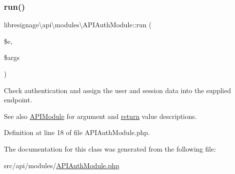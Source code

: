 \subsubsection{\texorpdfstring{run()}{run()}}
{\footnotesize\ttfamily libresignage\textbackslash{}api\textbackslash{}modules\textbackslash{}\+A\+P\+I\+Auth\+Module\+::run (\begin{DoxyParamCaption}\item[{\hyperlink{classlibresignage_1_1api_1_1APIEndpoint}{A\+P\+I\+Endpoint}}]{\$e,  }\item[{array}]{\$args }\end{DoxyParamCaption})}

Check authentication and assign the user and session data into the supplied endpoint.

\begin{DoxySeeAlso}{See also}
\hyperlink{classlibresignage_1_1api_1_1APIModule}{A\+P\+I\+Module} for argument and \hyperlink{quota_200-default_8php_ae057f510746f2e7dcbd7d8ccfaf92a45}{return} value descriptions. 
\end{DoxySeeAlso}


Definition at line 18 of file A\+P\+I\+Auth\+Module.\+php.



The documentation for this class was generated from the following file\+:\begin{DoxyCompactItemize}
\item 
src/api/modules/\hyperlink{APIAuthModule_8php}{A\+P\+I\+Auth\+Module.\+php}\end{DoxyCompactItemize}
